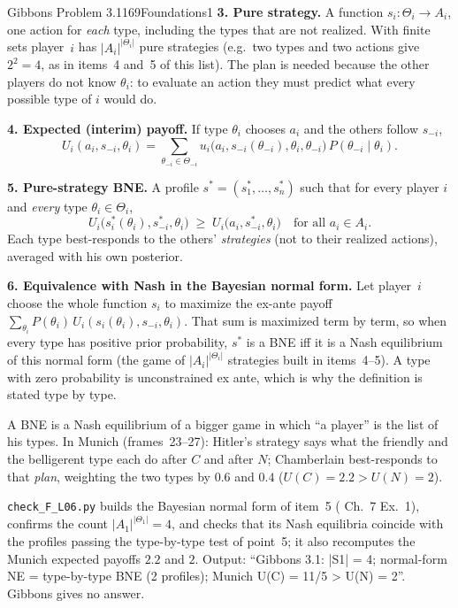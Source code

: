 \begin{exsol}{Gibbons Problem 3.1}{169}{Foundations}{1}
\textbf{3. Pure strategy.} A function $s_i : \Theta_i \to A_i$, one action for \emph{each} type,
including the types that are not realized. With finite sets player~$i$ has $|A_i|^{|\Theta_i|}$
pure strategies (e.g.\ two types and two actions give $2^2 = 4$, as in items~4 and~5 of this
list). The plan is needed because the other players do not know $\theta_i$: to evaluate an action
they must predict what every possible type of $i$ would do.

\textbf{4. Expected (interim) payoff.} If type $\theta_i$ chooses $a_i$ and the others follow
$s_{-i}$,
\[
  U_i(a_i, s_{-i}, \theta_i) = \sum_{\theta_{-i}\in\Theta_{-i}}
  u_i\bigl(a_i, s_{-i}(\theta_{-i}), \theta_i, \theta_{-i}\bigr)\,P(\theta_{-i}\mid\theta_i).
\]

\textbf{5. Pure-strategy BNE.} A profile $s^* = (s_1^*,\dots,s_n^*)$ such that for every player $i$
and \emph{every} type $\theta_i \in \Theta_i$,
\[
  U_i\bigl(s_i^*(\theta_i), s_{-i}^*, \theta_i\bigr) \;\ge\; U_i\bigl(a_i, s_{-i}^*, \theta_i\bigr)
  \quad\text{for all } a_i \in A_i .
\]
Each type best-responds to the others' \emph{strategies} (not to their realized actions), averaged
with his own posterior.

\textbf{6. Equivalence with Nash in the Bayesian normal form.} Let player~$i$ choose the whole
function $s_i$ to maximize the ex-ante payoff $\sum_{\theta_i} P(\theta_i)\,U_i(s_i(\theta_i),
s_{-i},\theta_i)$. That sum is maximized term by term, so when every type has positive prior
probability, $s^*$ is a BNE iff it is a Nash equilibrium of this normal form (the game of
$|A_i|^{|\Theta_i|}$ strategies built in items~4--5). A type with zero probability is unconstrained
ex ante, which is why the definition is stated type by type.

\interp A BNE is a Nash equilibrium of a bigger game in which ``a player'' is the list of his
types. In Munich (frames~23--27): Hitler's strategy says what the friendly and the belligerent
type each do after $C$ and after $N$; Chamberlain best-responds to that \emph{plan}, weighting the
two types by $0.6$ and $0.4$ ($U(C) = 2.2 > U(N) = 2$).

\verify \texttt{check\_F\_L06.py} builds the Bayesian normal form of item~5 (\MG{} Ch.~7 Ex.~1),
confirms the count $|A_1|^{|\Theta_1|} = 4$, and checks that its Nash equilibria coincide with the
profiles passing the type-by-type test of point~5; it also recomputes the Munich expected payoffs
$2.2$ and $2$. Output: ``Gibbons 3.1: |S1| = 4; normal-form NE = type-by-type BNE (2 profiles);
Munich U(C) = 11/5 > U(N) = 2''. Gibbons gives no answer.


\end{exsol}
